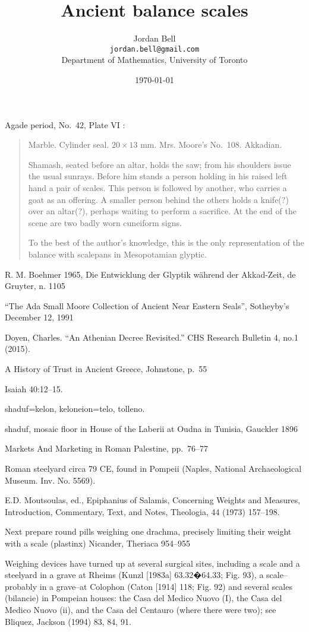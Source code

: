 \documentclass{article}
\title{Ancient balance scales}
\author{Jordan Bell\\ \texttt{jordan.bell@gmail.com}\\Department of Mathematics, University of Toronto}
\date{\today}
\begin{document}
\maketitle

Agade period, No.~42, Plate VI \cite[p.~46]{OIP47}:

\begin{quote}
Marble. Cylinder seal. $20 \times 13$ mm. Mrs. Moore's No.~108. Akkadian.

Shamash, seated before an altar, holds the saw; from his shoulders issue the usual 
sunrays. Before him stands a person holding in his raised left hand a pair of scales. This 
person is followed by another, who carries a goat as an offering. A smaller person behind
the others holds a knife(?) over an altar(?), perhaps waiting to perform a sacrifice. At
the end of the scene are two badly worn cuneiform signs.

To the best of the author's knowledge, this is the only representation of the balance with scalepans in
Mesopotamian glyptic.
\end{quote}

R. M. Boehmer 1965, Die Entwicklung der Glyptik w\"ahrend der
Akkad-Zeit, de Gruyter, n. 1105

``The Ada Small Moore Collection of Ancient Near Eastern Seals'', Sotheyby's December 12, 1991

Doyen, Charles. ``An Athenian Decree Revisited.'' CHS Research Bulletin 4, no.1 (2015).

A History of Trust in Ancient Greece, Johnstone, p.~55

Isaiah 40:12--15.

shaduf=kelon, keloneion=telo, tolleno. 

shaduf, mosaic floor in House of the Laberii at Oudna in Tunisia, Gauckler 1896

Markets And Marketing in Roman Palestine, pp.~76--77

Roman steelyard circa 79 CE, found in Pompeii (Naples, National Archaeological Museum. Inv. No. 5569).

E.D. Moutsoulas, ed., Epiphanius of Salamis, Concerning Weights and Measures, Introduction, Commentary, Text, and Notes, Theologia, 44 (1973) 157--198.

Next prepare round pills weighing one drachma, precisely limiting their weight with a scale (plastinx) Nicander, Theriaca 954--955

Weighing devices have turned up at several surgical sites, including a scale and a steelyard in a grave at Rheims (Kunzl [1983a] 63.32�64.33; Fig. 93), a scale--probably in a grave--at Colophon (Caton [1914] 118; Fig. 92) and several scales (bilancie) in Pompeian houses: the Casa del Medico Nuovo (I), the Casa del Medico Nuovo (ii), and the Casa del Centauro (where there were two); see Bliquez, Jackson (1994) 83, 84, 91.
\end{document}
